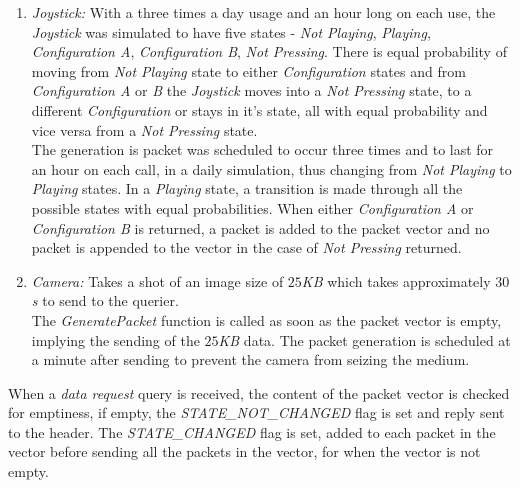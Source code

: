 \begin{enumerate}
{    configurations} and when in any of the \textit{Configurations} there is an equal
    probability of moving to a \textit{Not Pressing} state or staying in the same
    state but no chance of going to another \textit{Configuration} without first having
    to go through a \textit{Not Pressing} state. Having same chance of moving to any
    of other states from the \textit{Not Pressing} state. It is used 10 times a day and
    lasts for approximately \textit{$8s$} per use.\\
    The \textit{TV remote} class is programmed to fill up the packet vector 10 times
    in a day of simulation. The generation of the packets lasts for \textit{$8s$}. During
    this time which the \textit{GeneratePacket} function is called, the various states
    changes are simulated using Markov. When a \textit{Not Pressing} state is returned,
    no packet is added to the vector but for the other two states, packets are added to
    the vector.
\item \textit{Joystick:} With a three times a day usage and an hour long on each use,
    the \textit{Joystick} was simulated to have five states - \textit{Not Playing},
    \textit{Playing}, \textit{Configuration A}, \textit{Configuration B},\textit{
    Not Pressing}. There is equal probability of moving from \textit{Not Playing} state
    to either \textit{Configuration} states and from \textit{Configuration A} or \textit{B}
    the \textit{Joystick} moves into a \textit{Not Pressing} state, to a different
    \textit{Configuration} or stays in it's state, all with equal probability and vice
    versa from a \textit{Not Pressing} state.\\
    The generation is packet was scheduled to occur three times and to last for an hour
    on each call, in a daily simulation, thus changing from \textit{Not Playing} to
    \textit{Playing} states. In a \textit{Playing} state, a transition is made through
    all the possible states with equal probabilities. When either \textit{Configuration A}
    or \textit{Configuration B} is returned, a packet is added to the packet vector and
    no packet is appended to the vector in the case of \textit{Not Pressing} returned.
\item \textit{Camera:} Takes a shot of an image size of \textit{$25$KB} which takes
    approximately \textit{$30$s} to send to the querier.\\
    The \textit{GeneratePacket} function is called as soon as the packet vector is empty,
    implying the sending of the \textit{$25$KB} data. The packet generation is scheduled
    at a minute after sending to prevent the camera from seizing the medium.
\end{enumerate}
When a \textit{data request} query is received, the content of the packet vector is checked
for emptiness, if empty, the \textit{STATE\_NOT\_CHANGED} flag is set and reply sent to
the header. The \textit{STATE\_CHANGED} flag is set, added to each packet in the vector
before sending all the packets in the vector, for when the vector is not empty.
